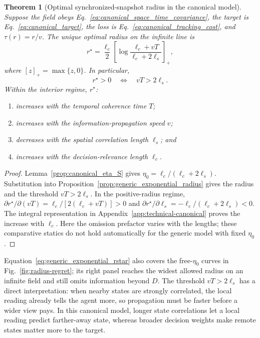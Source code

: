 \documentclass[11pt]{article}
\newtheorem{theorem}{Theorem}
\begin{document}
\begin{samepage}
\begin{theorem}[Optimal synchronized-snapshot radius in the canonical model]
\label{thm:canonical_optimal_radius}
Suppose the field obeys Eq.~\eqref{eq:canonical_space_time_covariance},
the target is Eq.~\eqref{eq:canonical_target}, the loss is
Eq.~\eqref{eq:canonical_tracking_cost}, and $\tau(r)=r/v$.
The unique optimal radius on the infinite line is
\begin{equation}
\boxed{r^\star=\frac{\ell_c}{2}
\left[\log\frac{\ell_c+vT}{\ell_c+2\ell_s}\right]_+,}
\label{eq:canonical_optimal_radius}
\end{equation}
where $[z]_+=\max\{z,0\}$. In particular,
\begin{equation}
r^\star>0\quad\Longleftrightarrow\quad vT>2\ell_s.
\label{eq:positive_radius_condition}
\end{equation}
Within the interior regime, $r^\star$:
\begin{enumerate}
    \item increases with the temporal coherence time $T$;
    \item increases with the information-propagation speed $v$;
    \item decreases with the spatial correlation length $\ell_s$; and
    \item increases with the decision-relevance length $\ell_c$.
\end{enumerate}
\end{theorem}
\end{samepage}

\begin{proof}
Lemma~\ref{prop:canonical_eta_S} gives
$\eta_0=\ell_c/(\ell_c+2\ell_s)$. Substitution into
Proposition~\ref{prop:generic_exponential_radius} gives the radius and
the threshold $vT>2\ell_s$. In the positive-radius regime,
$\partial r^\star/\partial(vT)=\ell_c/[2(\ell_c+vT)]>0$ and
$\partial r^\star/\partial\ell_s=-\ell_c/(\ell_c+2\ell_s)<0$.
The integral representation in Appendix~\ref{app:technical-canonical}
proves the increase with $\ell_c$. Here the omission prefactor varies with
the lengths; these comparative statics do not hold automatically for the
generic model with fixed $\eta_0$.
\end{proof}

Equation~\eqref{eq:generic_exponential_rstar} also covers the free-$\eta_0$
curves in Fig.~\ref{fig:radius-regret}; its right panel reaches the widest
allowed radius on an infinite field and still omits information beyond $D$.
The threshold $vT>2\ell_s$ has a direct interpretation: when nearby states
are strongly correlated, the local reading already tells the agent more,
so propagation must be faster before a wider view pays.
In this canonical model, longer state correlations let a local reading predict
farther-away state, whereas broader decision weights make remote states
matter more to the target.
\end{document}
